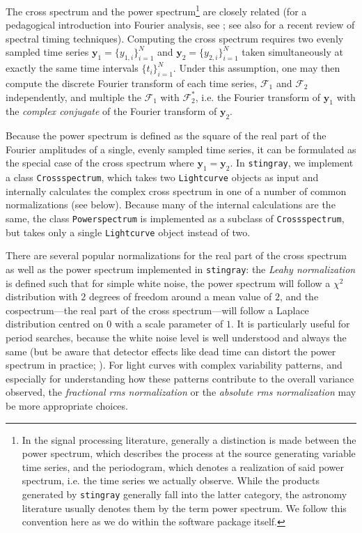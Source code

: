 \documentclass[twocolumn]{aastex62}
\newcommand{\stingray}{\texttt{stingray}\xspace}
\newcommand{\lightcurve}{\texttt{Lightcurve}\xspace}
\newcommand{\crossspectrum}{\texttt{Crossspectrum}\xspace}
\newcommand{\powerspectrum}{\texttt{Powerspectrum}\xspace}
\begin{document}
The cross spectrum and the power spectrum\footnote{In the signal processing literature, generally a distinction is made between the power spectrum, which
describes the process at the source generating variable time series, and the periodogram, which denotes a realization of said power spectrum, i.e. the time series we actually observe. While the products generated by \stingray generally fall into the latter category, the astronomy literature usually denotes them by the term power spectrum. We follow this convention here as we do within the software package itself.} are closely related (for a pedagogical introduction into Fourier analysis, see \citealt{vanderklis1989}; see also \citealt{uttley2014} for a recent review of spectral timing techniques). Computing the cross spectrum requires two evenly sampled time series $\mathbf{y}_1 = \{y_{1,i}\}_{i=1}^{N} $ and $\mathbf{y}_2 =  \{y_{2,i}\}_{i=1}^{N}$ taken simultaneously at exactly the same time intervals $\{t_i \}_{i=1}^N$. Under this assumption, one may then compute the discrete Fourier transform of each time series, $\mathcal{F}_1$ and $\mathcal{F}_2$ independently, and multiple the $\mathcal{F}_1$ with $\mathcal{F}^{*}_2$, i.e. the Fourier transform of $\mathbf{y}_1$ with the \textit{complex conjugate} of the Fourier transform of $\mathbf{y}_2$. 

Because the power spectrum is defined as the square of the real part of the Fourier amplitudes of a single, evenly sampled time series, it can be formulated as the special case of the cross spectrum where $\mathbf{y}_1 = \mathbf{y}_2$. In \stingray, we implement a class \crossspectrum, which takes two \lightcurve objects as input and internally calculates the complex cross spectrum in one of a number of common normalizations (see below).  Because many of the internal calculations are the same, the class \powerspectrum is implemented as a subclass of \crossspectrum, but takes only a single \lightcurve object instead of two. 

There are several popular normalizations for the real part of the cross spectrum as well as the power spectrum implemented in \stingray: the \textit{Leahy normalization} \citep{leahy1983} is defined such that for simple white noise, the power spectrum will follow a $\chi^2$ distribution with $2$ degrees of freedom around a mean value of $2$, and the cospectrum---the real part of the cross spectrum---will follow a Laplace distribution centred on $0$ with a scale parameter of $1$. It is particularly useful for period searches, because the white noise level is well understood and always the same (but be aware that detector effects like dead time can distort the power spectrum in practice; \citealt{Bachetti+15}).
For light curves with complex variability patterns, and especially for understanding how these patterns contribute to the overall variance observed, the \textit{fractional rms normalization} \citep{belloni1990,miyamoto1992}  or the \textit{absolute rms normalization} \citep{uttley2001} may be more appropriate choices. 
\end{document}
